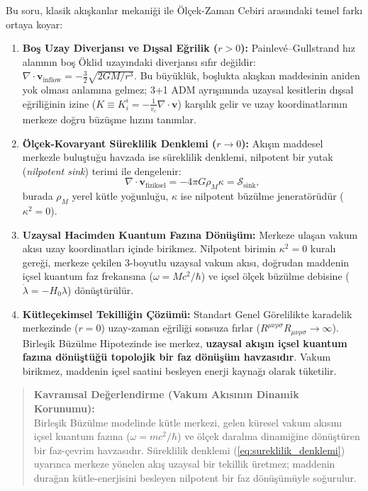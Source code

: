 \documentclass[11pt,a4paper]{article}
\begin{document}
Bu soru, klasik akışkanlar mekaniği ile Ölçek-Zaman Cebiri arasındaki temel farkı ortaya koyar:

\begin{enumerate}
    \item \textbf{Boş Uzay Diverjansı ve Dışsal Eğrilik ($r > 0$):} Painlevé--Gullstrand hız alanının boş Öklid uzayındaki diverjansı sıfır değildir: $\nabla \cdot \mathbf{v}_{\mathrm{inflow}} = -\frac{3}{2}\sqrt{2GM/r^3}$. Bu büyüklük, boşlukta akışkan maddesinin aniden yok olması anlamına gelmez; 3+1 ADM ayrışımında uzaysal kesitlerin dışsal eğriliğinin izine ($K \equiv K^i_i = -\frac{1}{v_c}\nabla\cdot\mathbf{v}$) karşılık gelir ve uzay koordinatlarının merkeze doğru büzüşme hızını tanımlar.
    \item \textbf{Ölçek-Kovaryant Süreklilik Denklemi ($r \to 0$):} Akışın maddesel merkezle buluştuğu havzada ise süreklilik denklemi, nilpotent bir yutak (\textit{nilpotent sink}) terimi ile dengelenir:
          \begin{equation}
              \nabla \cdot \mathbf{v}_{\mathrm{fiziksel}} = -4\pi G \rho_M \kappa = \mathcal{S}_{\mathrm{sink}},
              \label{eq:sureklilik_denklemi}
          \end{equation}
          burada $\rho_M$ yerel kütle yoğunluğu, $\kappa$ ise nilpotent büzülme jeneratörüdür ($\kappa^2 = 0$).
    \item \textbf{Uzaysal Hacimden Kuantum Fazına Dönüşüm:} Merkeze ulaşan vakum akısı uzay koordinatları içinde birikmez. Nilpotent birimin $\kappa^2 = 0$ kuralı gereği, merkeze çekilen 3-boyutlu uzaysal vakum akısı, doğrudan maddenin içsel kuantum faz frekansına ($\omega = M c^2 / \hbar$) ve içsel ölçek büzülme debisine ($\dot{\lambda} = -H_0 \lambda$) dönüştürülür.
    \item \textbf{Kütleçekimsel Tekilliğin Çözümü:} Standart Genel Görelilikte karadelik merkezinde ($r=0$) uzay-zaman eğriliği sonsuza fırlar ($R^{\mu\nu\rho\sigma} R_{\mu\nu\rho\sigma} \to \infty$). Birleşik Büzülme Hipotezinde ise merkez, \textbf{uzaysal akışın içsel kuantum fazına dönüştüğü topolojik bir faz dönüşüm havzasıdır}. Vakum birikmez, maddenin içsel saatini besleyen enerji kaynağı olarak tüketilir.
\end{enumerate}

\begin{quote}
    \small
    \textbf{Kavramsal Değerlendirme (Vakum Akısının Dinamik Korunumu):} \\
    Birleşik Büzülme modelinde kütle merkezi, gelen küresel vakum akısını içsel kuantum fazına ($\omega = mc^2/\hbar$) ve ölçek daralma dinamiğine dönüştüren bir faz-çevrim havzasıdır. Süreklilik denklemi (\ref{eq:sureklilik_denklemi}) uyarınca merkeze yönelen akış uzaysal bir tekillik üretmez; maddenin durağan kütle-enerjisini besleyen nilpotent bir faz dönüşümüyle soğurulur.
\end{quote}
\end{document}

